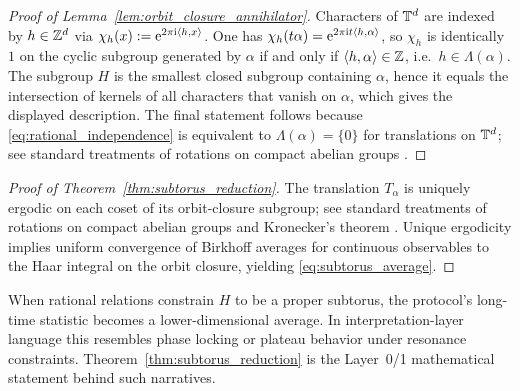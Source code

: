 \begin{proof}[Proof of Lemma~\ref{lem:orbit_closure_annihilator}]
Characters of $\mathbb{T}^d$ are indexed by $h\in\mathbb{Z}^d$ via $\chi_h(x):=\mathrm{e}^{2\pi\mathrm{i}\langle h,x\rangle}$. One has $\chi_h(t\alpha)=\mathrm{e}^{2\pi\mathrm{i} t\langle h,\alpha\rangle}$, so $\chi_h$ is identically $1$ on the cyclic subgroup generated by $\alpha$ if and only if $\langle h,\alpha\rangle\in\mathbb{Z}$, i.e.\ $h\in\Lambda(\alpha)$. The subgroup $H$ is the smallest closed subgroup containing $\alpha$, hence it equals the intersection of kernels of all characters that vanish on $\alpha$, which gives the displayed description. The final statement follows because \eqref{eq:rational_independence} is equivalent to $\Lambda(\alpha)=\{0\}$ for translations on $\mathbb{T}^d$; see standard treatments of rotations on compact abelian groups \cite{Walters1982,KatokHasselblatt1995,KuipersNiederreiter1974}.
\end{proof}

\begin{proof}[Proof of Theorem~\ref{thm:subtorus_reduction}]
The translation $T_\alpha$ is uniquely ergodic on each coset of its orbit-closure subgroup; see standard treatments of rotations on compact abelian groups and Kronecker's theorem \cite{KuipersNiederreiter1974,Walters1982,KatokHasselblatt1995}. Unique ergodicity implies uniform convergence of Birkhoff averages for continuous observables to the Haar integral on the orbit closure, yielding \eqref{eq:subtorus_average}.
\end{proof}

\begin{remark}
When rational relations constrain $H$ to be a proper subtorus, the protocol's long-time statistic becomes a lower-dimensional average. In interpretation-layer language this resembles phase locking or plateau behavior under resonance constraints. Theorem~\ref{thm:subtorus_reduction} is the Layer~0/1 mathematical statement behind such narratives.
\end{remark}


